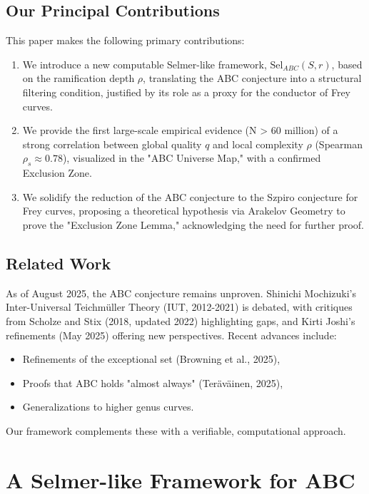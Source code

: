 \documentclass[11pt,a4paper]{article}
\newcommand{\Sel}{\mathrm{Sel}}
\begin{document}
\subsection{Our Principal Contributions}
This paper makes the following primary contributions:
\begin{enumerate}
    \item We introduce a new computable Selmer-like framework, \(\Sel_{ABC}(S,r)\), based on the ramification depth \(\rho\), translating the ABC conjecture into a structural filtering condition, justified by its role as a proxy for the conductor of Frey curves.
    \item We provide the first large-scale empirical evidence (N > 60 million) of a strong correlation between global quality \(q\) and local complexity \(\rho\) (Spearman \(\rho_s \approx 0.78\)), visualized in the "ABC Universe Map," with a confirmed Exclusion Zone.
    \item We solidify the reduction of the ABC conjecture to the Szpiro conjecture for Frey curves, proposing a theoretical hypothesis via Arakelov Geometry to prove the "Exclusion Zone Lemma," acknowledging the need for further proof.
\end{enumerate}

\subsection{Related Work}
As of August 2025, the ABC conjecture remains unproven. Shinichi Mochizuki's Inter-Universal Teichmüller Theory (IUT, 2012-2021) is debated, with critiques from Scholze and Stix (2018, updated 2022) highlighting gaps, and Kirti Joshi's refinements (May 2025) offering new perspectives. Recent advances include:
\begin{itemize}
    \item Refinements of the exceptional set (Browning et al., 2025),
    \item Proofs that ABC holds "almost always" (Teräväinen, 2025),
    \item Generalizations to higher genus curves.
\end{itemize}
Our framework complements these with a verifiable, computational approach.

\section{A Selmer-like Framework for ABC}
\end{document}
